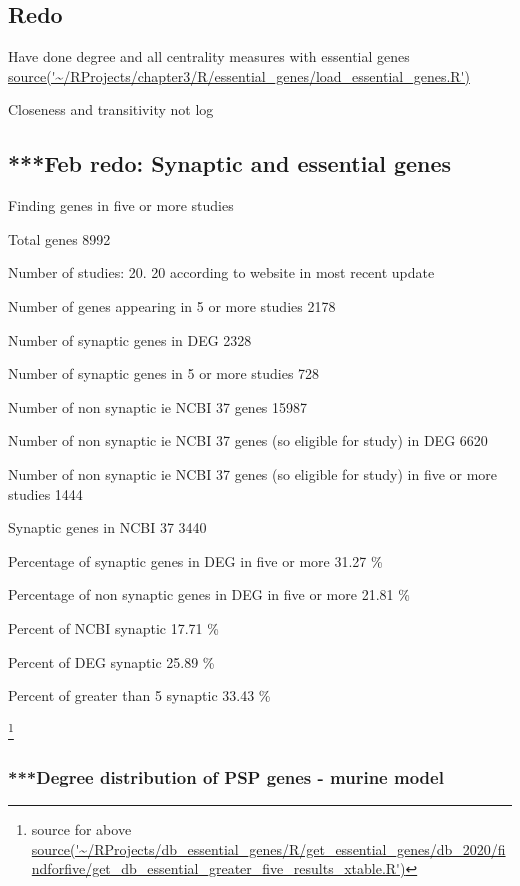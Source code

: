 \subsection{Redo}
Have done degree and all centrality measures with essential genes \url{source('~/RProjects/chapter3/R/essential_genes/load_essential_genes.R')}

Closeness and transitivity not log
\subsection{***Feb redo: Synaptic and essential genes}

     Finding genes in five or more studies  
     
     Total genes 8992  
     
     Number of studies: 20.              20 according to website in most recent update  
     
     Number of genes appearing in 5 or more studies 2178  
     
     Number of synaptic genes in DEG 2328  
     
     Number of synaptic genes in 5 or more studies 728  
     
      Number of non synaptic ie NCBI 37 genes 15987
      
     Number of non synaptic ie NCBI 37 genes (so eligible for study)             in DEG 6620  
     
     Number of non synaptic ie NCBI 37 genes (so eligible for study)             in five or more studies 1444  
     
     Synaptic genes in NCBI 37 3440  
     
     Percentage of synaptic genes in DEG in five or more 31.27 \%  
     
     Percentage of non synaptic genes in DEG in five or more 21.81 \% 
     
     Percent of NCBI synaptic 17.71 \%  
     
     Percent of DEG synaptic 25.89 \%  
     
     Percent of greater than 5 synaptic 33.43 \% 
     
     \footnote{source for above \url{source('~/RProjects/db_essential_genes/R/get_essential_genes/db_2020/findforfive/get_db_essential_greater_five_results_xtable.R')}}
  
  
  
 \subsubsection{***Degree distribution of PSP genes - murine model}
 
